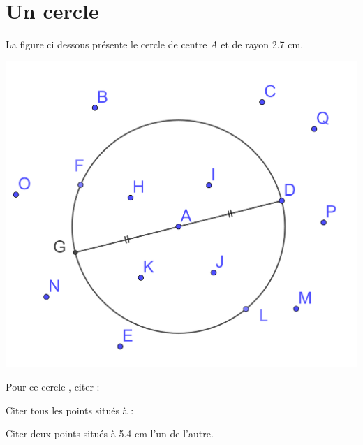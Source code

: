 \section{Un cercle}

La figure ci dessous présente le cercle de centre $A$ et de rayon \num{2,7} cm.

\begin{center}
	\includegraphics[scale=0.15]{./img/cercle}
\end{center}

\begin{questions}
	\question Pour ce cercle , citer :
	

	\question Citer tous les points situés à :
	

	\question Citer deux points situés à \num{5.4} cm l'un de l'autre.
\end{questions}